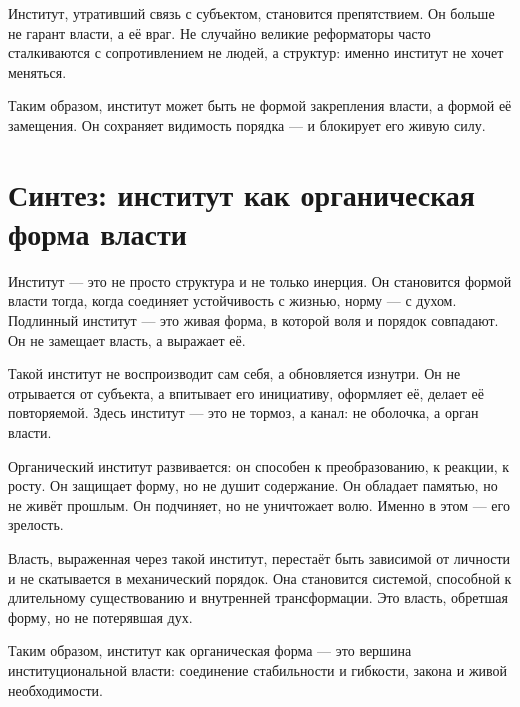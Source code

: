 Институт, утративший связь с субъектом, становится препятствием. Он больше не гарант власти, а её враг. Не случайно великие реформаторы часто сталкиваются с сопротивлением не людей, а структур: именно институт не хочет меняться.

Таким образом, институт может быть не формой закрепления власти, а формой её замещения. Он сохраняет видимость порядка — и блокирует его живую силу.

\section{Синтез: институт как органическая форма власти}

Институт — это не просто структура и не только инерция. Он становится формой власти тогда, когда соединяет устойчивость с жизнью, норму — с духом. Подлинный институт — это живая форма, в которой воля и порядок совпадают. Он не замещает власть, а выражает её.

Такой институт не воспроизводит сам себя, а обновляется изнутри. Он не отрывается от субъекта, а впитывает его инициативу, оформляет её, делает её повторяемой. Здесь институт — это не тормоз, а канал: не оболочка, а орган власти.

Органический институт развивается: он способен к преобразованию, к реакции, к росту. Он защищает форму, но не душит содержание. Он обладает памятью, но не живёт прошлым. Он подчиняет, но не уничтожает волю. Именно в этом — его зрелость.

Власть, выраженная через такой институт, перестаёт быть зависимой от личности и не скатывается в механический порядок. Она становится системой, способной к длительному существованию и внутренней трансформации. Это власть, обретшая форму, но не потерявшая дух.

Таким образом, институт как органическая форма — это вершина институциональной власти: соединение стабильности и гибкости, закона и живой необходимости.
